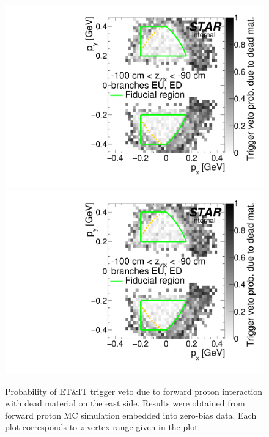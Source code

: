 \begin{figure}[hb]
\caption[Probability of ET\&IT trigger veto due to forward proton interaction with dead material on the east.]{Probability of ET\&IT trigger veto due to forward proton interaction with dead material on the east side. Results were obtained from forward proton MC simulation embedded into zero-bias data. Each plot corresponds to $z$-vertex range given in the plot.}\label{fig:rpDeadMatProbE} 
\centering
\parbox{0.495\textwidth}{
  \centering
  \includegraphics[width=\linewidth,page=3]{graphics/corrections/mcDeadMatProbPxPy.pdf}\\
  \includegraphics[width=\linewidth,page=5]{graphics/corrections/mcDeadMatProbPxPy.pdf}\\
}
\end{figure}
